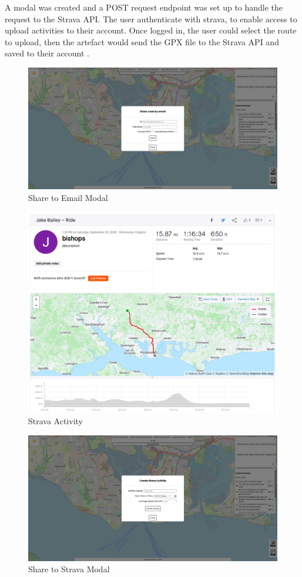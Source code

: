 A modal was created  and a POST request endpoint was set up to handle the request to the Strava API. The user authenticate with strava, to enable access to upload activities to their account. Once logged in, the user could select the route to upload, then the artefact would send the GPX file to the Strava API and saved to their account .

\begin{figure}[!ht]
  \centering
  \includegraphics[width=425px]{figures/Progress Images/Iteration-2/SR17/SR17png.png}
  \caption{Share to Email Modal}
  \label{fig:share-email-modal}
\end{figure}

\begin{figure}[!ht]
  \centering
  \includegraphics[width=425px]{figures/Progress Images/Iteration-2/SR18/SR18 Upload Example 1.png}
  \caption{Strava Activity}
  \label{fig:strava-example}
\end{figure}

\begin{figure}[!ht]
  \centering
  \includegraphics[width=425px]{figures/Progress Images/Iteration-2/SR18/SR18 Strava Modal.png}
  \caption{Share to Strava Modal}
  \label{fig:strava-modal}
\end{figure}


